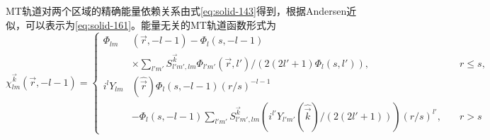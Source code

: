 MT轨道对两个区域的精确能量依赖关系由式\eqref{eq:solid-143}得到，根据Andersen近似，可以表示为\eqref{eq:solid-161}。能量无关的MT轨道函数形式为
\begin{equation}
  \chi_{lm}^{\vec k}(\vec r,-l-1)=\left\{
  \begin{aligned}
    \Phi_{lm}&(\vec r,-l-1)-\Phi_l(s,-l-1)&\\
    &\times\sum_{l'm'}S_{l'm',lm}^{\vec k}\Phi_{l'm'}(\vec r,l')/(2(2l'+1)\Phi_l(s,l')),&r\leqslant s,\\
    i^lY_{lm}&(\hat{\vec r})\Phi_l(s,-l-1)(r/s)^{-l-1}&\\
    &-\Phi_l(s,-l-1)\sum_{l'm'}S_{l'm',lm}^{\vec k}(i^{l'}Y_{l'm'}(\hat{\vec k})/(2(2l'+1)))(r/s)^{l'},\quad&r>s
  \end{aligned}\right.
  \label{eq:solid-172}
\end{equation}

